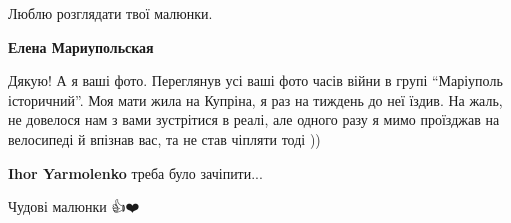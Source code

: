  
 
 
 
 

\qqSecCmt


Люблю розглядати твої малюнки.

\begin{itemize} %
\textbf{Елена Мариупольская} 

Дякую! А я ваші фото. Переглянув усі ваші фото часів війни в групі \enquote{Маріуполь
історичний}. Моя мати жила на Купріна, я раз на тиждень до неї їздив. На жаль,
не довелося нам з вами зустрітися в реалі, але одного разу я мимо проїзджав на
велосипеді й впізнав вас, та не став чіпляти тоді ))

\textbf{Ihor Yarmolenko} треба було зачіпити...
\end{itemize} %


Чудові малюнки 👍❤️
